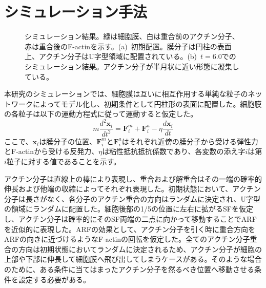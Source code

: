 \documentclass[10pt,twocolumn,a4j]{jarticle}
\begin{document}
\section{シミュレーション手法}
\begin{figure}[tbp]
\centering
 \caption{シミュレーション結果。緑は細胞膜、白は重合前のアクチン分子、赤は重合後のF-actinを示す。(a)~初期配置。膜分子は円柱の表面上、アクチン分子はU字型領域に配置されている。(b)~$t=6.0$でのシミュレーション結果。アクチン分子が半月状に近い形態に凝集している。}
 \label{fig:res0}
\end{figure}
本研究のシミュレーションでは、細胞膜は互いに相互作用する単純な粒子のネットワークによってモデル化し、初期条件として円柱形の表面に配置した。細胞膜の各粒子は以下の運動方程式に従って運動すると仮定した。
\begin{equation}
m\frac{d^2\bm{x}_i}{dt^2} = \bm{F}^m_i +  \bm{F}^a_i - \eta \frac{d\bm{x}_i}{dt}
\end{equation}
ここで、$\bm{x}_i$は膜分子の位置、$\bm{F}^m_i$と$\bm{F}^a_i$はそれぞれ近傍の膜分子から受ける弾性力とF-actinから受ける反発力、$\eta$は粘性抵抗抵抗係数であり、各変数の添え字$i$は第$i$粒子に対する値であることを示す。

アクチン分子は直線上の棒により表現し、重合および解重合はその一端の確率的伸長゙および他端の収縮によってそれぞれ表現した。初期状態において、アクチン分子は長さがなく、各分子のアクチン重合の方向はランダムに決定され、U字型の領域にランダムに配置した。細胞後部の1/5の位置に左右に拡がるSFを仮定し、アクチン分子は確率的にそのSF両端の二点に向かって移動することでARFを近似的に表現した。ARFの効果として、アクチン分子を引く時に重合方向をARFの向きに近づけるようなF-actinの回転を仮定した。全てのアクチン分子重合の方向は初期状態においてランダムに決定されるため、アクチン分子が細胞の上部や下部に伸長して細胞膜へ飛び出してしまうケースがある。そのような場合のために、ある条件に当てはまったアクチン分子を然るべき位置へ移動させる条件を設定する必要がある。
\end{document}
